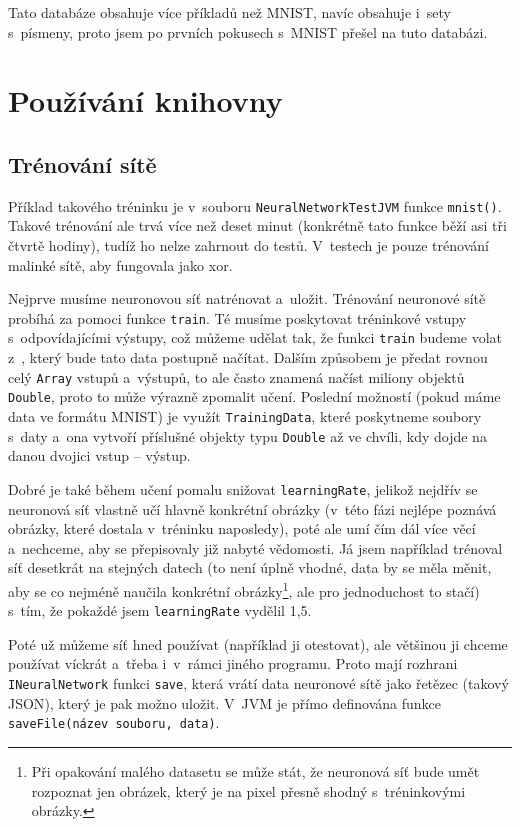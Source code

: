 \documentclass[12pt]{report}			%
\newcommand{\glsref}[1]{\glsdisp{#1}{\phantom{}}}
\begin{document}
					Tato databáze obsahuje více příkladů než MNIST, navíc obsahuje i~sety s~písmeny, proto jsem po prvních pokusech s~MNIST přešel na tuto databázi.

		\chapter{Používání knihovny}
			\section{Trénování sítě}
				Příklad takového tréninku je v~souboru \verb!NeuralNetworkTestJVM! funkce \verb!mnist()!. Takové trénování ale trvá více než deset minut (konkrétně tato funkce běží asi tři čtvrtě hodiny), tudíž ho nelze zahrnout do testů. V~testech je pouze trénování malinké sítě, aby fungovala jako \gls{xor}.
			
				Nejprve musíme neuronovou síť natrénovat a~uložit. Trénování neuronové sítě probíhá za pomoci funkce \verb!train!. Té musíme poskytovat tréninkové vstupy s~odpovídajícími výstupy, což můžeme udělat tak, že funkci \verb!train! budeme volat z~, který bude tato data postupně načítat. Dalším způsobem je předat rovnou celý \glsref{Array}\verb!Array! vstupů a~výstupů, to ale často znamená načíst miliony objektů  \glsref{Double}\verb!Double!, proto to může výrazně zpomalit učení. Poslední možností (pokud máme data ve formátu MNIST) je využít  \verb!TrainingData!, které poskytneme soubory s~daty a~ona vytvoří příslušné objekty \gls{typ}u \glsref{Double}\verb!Double! až ve chvíli, kdy dojde na danou dvojici vstup -- výstup.
				
				Dobré je také během učení pomalu snižovat \verb!learningRate!, jelikož nejdřív se neuronová síť vlastně učí hlavně konkrétní obrázky (v~této fázi nejlépe poznává obrázky, které dostala v~tréninku naposledy), poté ale umí čím dál více věcí a~nechceme, aby se přepisovaly již nabyté vědomosti. Já jsem například trénoval síť desetkrát na stejných datech (to není úplně vhodné, data by se měla měnit, aby se co nejméně naučila konkrétní obrázky\footnote{Při opakování malého datasetu se může stát, že neuronová síť bude umět rozpoznat jen obrázek, který je na pixel přesně shodný s~tréninkovými obrázky.}, ale pro jednoduchost to stačí) s~tím, že pokaždé jsem \verb!learningRate! vydělil 1,5.
				
				Poté už můžeme síť hned používat (například ji otestovat), ale většinou ji chceme používat víckrát a~třeba i~v~rámci jiného programu. Proto mají  \gls{rozhrani} \verb!INeuralNetwork! funkci \verb!save!, která vrátí data neuronové sítě jako řetězec (takový  \gls{JSON}), který je pak možno uložit. V~\gls{JVM} je přímo definována funkce \verb!saveFile(název souboru, data)!.
				
\end{document}
